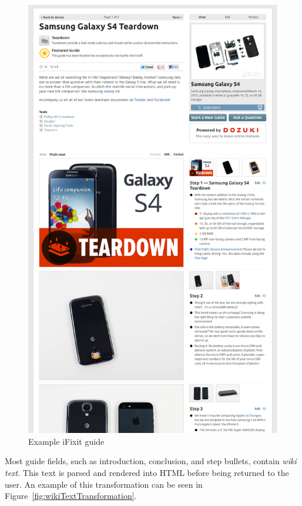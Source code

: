 \documentclass[12pt]{ucthesis}
\begin{document}
\begin{figure}[hbtp]
\centering
\includegraphics[width=\textwidth,height=0.95\textheight]{assets/iFixitGuideExample.png}
\caption{Example iFixit guide}
\label{fig:iFixitGuideExample}
\end{figure}

Most guide fields, such as introduction, conclusion, and step bullets, contain \textit{wiki text}.
This text is parsed and rendered into HTML before being returned to the user.
An example of this transformation can be seen in Figure~\ref{fig:wikiTextTransformation}.
\end{document}
